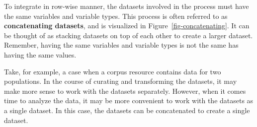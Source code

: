 \documentclass[
  letterpaper,
  krantz1]{latex/krantz-mod}
\theoremstyle{definition}
\theoremstyle{definition}
\theoremstyle{remark}
\begin{document}
To integrate in row-wise manner, the datasets involved in the process
must have the same variables and variable types. This process is often
referred to as \textbf{concatenating
datasets}, and is visualized in
Figure~\ref{fig-concatenating}. It can be thought of as stacking
datasets on top of each other to create a larger dataset. Remember,
having the same variables and variable types is not the same has having
the same values.

Take, for example, a case when a corpus resource contains data for two
populations. In the course of curating and transforming the datasets, it
may make more sense to work with the datasets separately. However, when
it comes time to analyze the data, it may be more convenient to work
with the datasets as a single dataset. In this case, the datasets can be
concatenated to create a single dataset.
\end{document}
